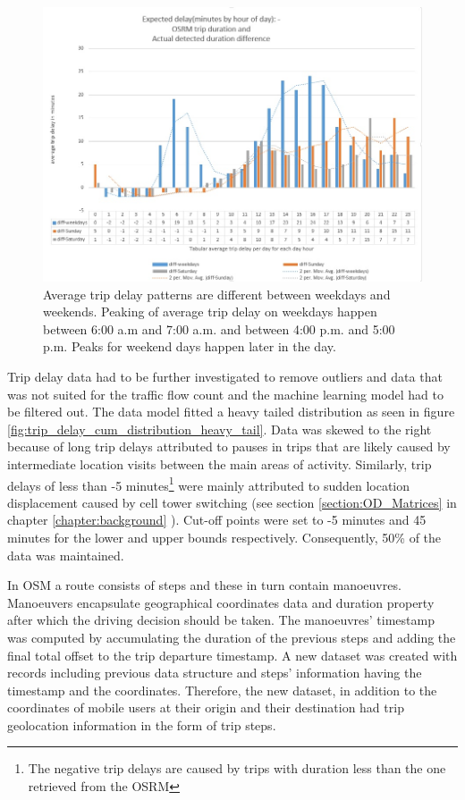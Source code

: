 \documentclass[12pt, a4paper]{report}
\theoremstyle{definition}
\theoremstyle{definition}%
\theoremstyle{definition}%
\theoremstyle{definition}%
\theoremstyle{definition}%
\theoremstyle{definition}%
\begin{document}
\begin{figure}[h]	
	\includegraphics[scale=0.65]{Trip_delay.jpg}
	\centering
	\caption[Hourly average trip delay weekdays vs weekends]{Average trip delay patterns are different between weekdays and weekends. Peaking of average trip delay on weekdays happen between 6:00 a.m and 7:00 a.m. and between 4:00 p.m. and 5:00 p.m. Peaks for weekend days happen later in the day.}
	\label{fig:trip_delay_weekdays_vs_weekends}
\end{figure}

Trip delay data had to be further investigated to remove outliers and data that was not suited for the traffic flow count and the machine learning model had to be filtered out. The data model fitted a heavy tailed distribution as seen in figure \ref{fig:trip_delay_cum_distribution_heavy_tail}. Data was skewed to the right because of long trip delays attributed to pauses in trips that are likely caused by intermediate location visits between the main areas of activity. Similarly, trip delays of less than -5 minutes\footnote{The negative trip delays are caused by trips with duration less than the one retrieved from the OSRM} were mainly attributed to sudden location displacement caused by cell tower switching (see section \ref{section:OD_Matrices} in chapter \ref{chapter:background} ). Cut-off points were set to -5 minutes and 45 minutes for the lower and upper bounds respectively. Consequently, 50\% of the data was maintained.  

In OSM a route consists of steps and these in turn contain manoeuvres. Manoeuvers encapsulate geographical coordinates data and duration property after which the driving decision should be taken. The manoeuvres' timestamp was computed by accumulating the duration of the previous steps and adding the final total offset to the trip departure timestamp. A new dataset was created with records including previous data structure and steps' information having the timestamp and the coordinates. Therefore, the new dataset, in addition to the coordinates of mobile users at their origin and their destination had trip geolocation information in the form of trip steps.
 
\end{document}
